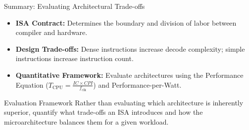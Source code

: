 \documentclass[aspectratio=169,11pt,t]{beamer}
\newcommand{\key}[1]{\textbf{#1}}
\begin{document}

\begin{frame}{Summary: Evaluating Architectural Trade-offs}
\large
\begin{itemize}\setlength{\itemsep}{7pt}
  \item \key{ISA Contract:} Determines the boundary and division of labor between compiler and hardware.
  \item \key{Design Trade-offs:} Dense instructions increase decode complexity; simple instructions increase instruction count.
  \item \key{Quantitative Framework:} Evaluate architectures using the Performance Equation ($T_{\text{CPU}} = \frac{\mathit{IC} \times \mathit{CPI}}{f_{\text{clk}}}$) and Performance-per-Watt.
\end{itemize}

\vspace{0.3cm}
\normalsize
\begin{block}{Evaluation Framework}
Rather than evaluating which architecture is inherently superior, quantify what trade-offs an ISA introduces and how the microarchitecture balances them for a given workload.
\end{block}
\end{frame}
\end{document}
